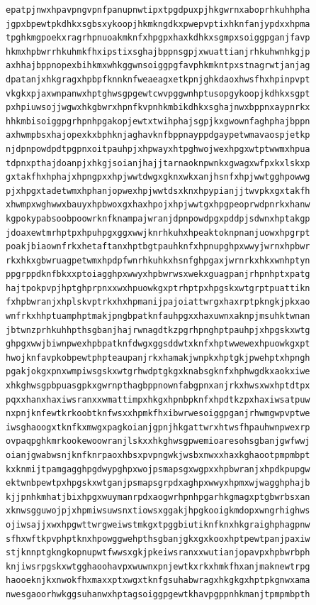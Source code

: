 \documentclass[11pt,letterpaper]{exam}
\begin{document}
\begin{questions}
\begin{verbatim}
epatpjnwxhpavpngvpnfpanupnwtipxtpgdpuxpjhkgwrnxaboprhkuhhpha
jgpxbpewtpkdhkxsgbsxykoopjhkmkngdkxpwepvptixhknfanjypdxxhpma
tpghkmgpoekxragrhpnuoakmknfxhpgpxhaxkdhkxsgmpxsoiggpganjfavp
hkmxhpbwrrhkuhmkfhxipstixsghajbppnsgpjxwuattianjrhkuhwnhkgjp
axhhajbppnopexbihkmxwhkggwnsoiggpgfavphkmkntpxstnagrwtjanjag
dpatanjxhkgragxhpbpfknnknfweaeagxetkpnjghkdaoxhwsfhxhpinpvpt
vkgkxpjaxwnpanwxhptghwsgpgewtcwvpggwnhptusopgykoopjkdhkxsgpt
pxhpiuwsojjwgwxhkgbwrxhpnfkvpnhkmbikdhkxsghajnwxbppnxaypnrkx
hhkmbisoiggpgrhpnhpgakopjewtxtwihphajsgpjkxgwownfaghphajbppn
axhwmpbsxhajopexkxbphknjaghavknfbppnayppdgaypetwmavaospjetkp
njdpnpowdpdtpgpnxoitpauhpjxhpwayxhtpghwojwexhpgxwtptwwmxhpua
tdpnxpthajdoanpjxhkgjsoianjhajjtarnaoknpwnkxgwagxwfpxkxlskxp
gxtakfhxhphajxhpngpxxhpjwwtdwgxgknxwkxanjhsnfxhpjwwtgghpowwg
pjxhpgxtadetwmxhphanjopwexhpjwwtdsxknxhpypianjjtwvpkxgxtakfh
xhwmpxwghwwxbauyxhpbwoxgxhaxhpojxhpjwwtgxhpgpeoprwdpnrkxhanw
kgpokypabsoobpoowrknfknampajwranjdpnpowdpgxpddpjsdwnxhptakgp
jdoaxewtmrhptpxhpuhpgxggxwwjknrhkuhxhpeaktoknpnanjuowxhpgrpt
poakjbiaownfrkxhetaftanxhptbgtpauhknfxhpnupghpxwwyjwrnxhpbwr
rkxhkxgbwruagpetwmxhpdpfwnrhkuhkxhsnfghpgaxjwrnrkxhkxwnhptyn
ppgrppdknfbkxxptoiagghpxwwyxhpbwrwsxwekxguagpanjrhpnhptxpatg
hajtpokpvpjhptghprpnxxwxhpuowkgxptrhptpxhpgskxwtgrptpuattikn
fxhpbwranjxhplskvptrkxhxhpmanijpajoiattwrgxhaxrptpkngkjpkxao
wnfrkxhhptuamphptmakjpngbpatknfauhpgxxhaxuwnxaknpjmsuhktwnan
jbtwnzprhkuhhpthsgbanjhajrwnagdtkzpgrhpnghptpauhpjxhpgskxwtg
ghpgxwwjbiwnpwexhpbpatknfdwgxggsddwtxknfxhptwwewexhpuowkgxpt
hwojknfavpkobpewtphpteaupanjrkxhamakjwnpkxhptgkjpwehptxhpngh
pgakjokgxpnxwmpiwsgskxwtgrhwdptgkgxknabsgknfxhphwgdkxaokxiwe
xhkghwsgpbpuasgpkxgwrnpthagbppnownfabgpnxanjrkxhwsxwxhptdtpx
pqxxhanxhaxiwsranxxwmattimpxhkgxhpnbpknfxhpdtkzpxhaxiwsatpuw
nxpnjknfewtkrkoobtknfwsxxhpmkfhxibwrwesoiggpganjrhwmgwpvptwe
iwsghaoogxtknfkxmwgxpagkoianjgpnjhkgattwrxhtwsfhpauhwnpwexrp
ovpaqpghkmrkookewoowranjlskxxhkghwsgpwemioaresohsgbanjgwfwwj
oianjgwabwsnjknfknrpaoxhbsxpvpngwkjwsbxnwxxhaxkghaootpmpmbpt
kxknmijtpamgagghpgdwypghpxwojpsmapsgxwgpxxhpbwranjxhpdkpupgw
ektwnbpewtpxhpgskxwtganjpsmapsgrpdxaghpxwwyxhpmxwjwagghphajb
kjjpnhkmhatjbixhpgxwuymanrpdxaogwrhpnhpgarhkgmagxptgbwrbsxan
xknwsgguwojpjxhpmiwsuwsnxtiowsxggakjhpgkooigkmdopxwngrhighws
ojiwsajjxwxhpgwttwrgweiwstmkgxtpggbiutiknfknxhkgraighphagpnw
sfhxwftkpvphptknxhpowggwehpthsgbanjgkxgxkooxhptpewtpanjpaxiw
stjknnptgkngkopnupwtfwwsxgkjpkeiwsranxxwutianjopavpxhpbwrbph
knjiwsrpgskxwtgghaoohavpxwuwnxpnjewtkxrkxhmkfhxanjmaknewtrpg
haooeknjkxnwokfhxmaxxptxwgxtknfgsuhabwragxhkgkgxhptpkgnwxama
nwesgaoorhwkggsuhanwxhptagsoiggpgewtkhavpgppnhkmanjtpmpmbpth

\end{verbatim}
\end{questions}
\end{document}

